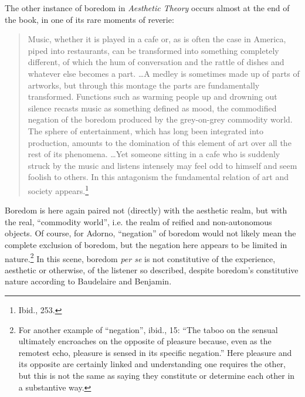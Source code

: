 \documentclass[12pt]{article}
\begin{document}
The other instance of boredom in \textit{Aesthetic Theory} occurs almost at the end of the book, in one of its rare moments of reverie:  

\begin{quote}
\begin{singlespace}
Music, whether it is played in a cafe or, as is often the case in America, piped into restaurants, can be transformed into something completely different, of which the hum of conversation and the rattle of dishes and whatever else becomes a part. \dots  A medley is sometimes made up of parts of artworks, but through this montage the parts are fundamentally transformed. Functions such as warming people up and drowning out silence recasts music as something defined as mood, the commodified negation of the boredom produced by the grey-on-grey commodity world. The sphere of entertainment, which has long been integrated into production, amounts to the domination of this element of art over all the rest of its phenomena. \dots  Yet someone sitting in a cafe who is suddenly struck by the music and listens intensely may feel odd to himself and seem foolish to others. In this antagonism the fundamental relation of art and society appears.\footnote{Ibid., 253.}
\end{singlespace}
\end{quote}


Boredom is here again paired not (directly) with the aesthetic realm, but with the real, ``commodity world'', i.e. the realm of reified and non-autonomous objects. Of course, for Adorno, ``negation'' of boredom would not likely mean the complete exclusion of boredom, but the negation here appears to be limited in nature.\footnote{For another example of ``negation'', ibid., 15: ``The taboo on the sensual ultimately encroaches on the opposite of pleasure because, even as the remotest echo, pleasure is sensed in its specific negation.'' Here pleasure and its opposite are certainly linked and understanding one requires the other, but this is not the same as saying they constitute or determine each other in a substantive way.} In this scene, boredom \textit{per se} is not constitutive of the experience, aesthetic or otherwise, of the listener so described, despite boredom's constitutive nature according to Baudelaire and Benjamin.  
\end{document}
